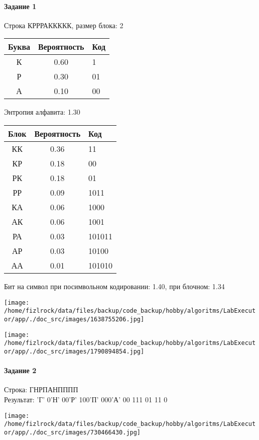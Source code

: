 \documentclass[a4paper, 12pt]{article}
\begin{document}
\paragraph{Задание 1}

Строка КРРРАККККК, размер блока: 2
\begin{center}
 \begin{tabular}{ |c|c|l| } 
  \hline
     Буква & Вероятность & Код\\ \hline
К & 0.60 & 1\\\hline
Р & 0.30 & 01\\\hline
А & 0.10 & 00
\\ \hline \end{tabular}
\end{center}
Энтропия алфавита: 1.30
\begin{center}
 \begin{tabular}{ |c|c|l| } 
  \hline
     Блок & Вероятность & Код\\ \hline
КК & 0.36 & 11\\\hline
КР & 0.18 & 00\\\hline
РК & 0.18 & 01\\\hline
РР & 0.09 & 1011\\\hline
КА & 0.06 & 1000\\\hline
АК & 0.06 & 1001\\\hline
РА & 0.03 & 101011\\\hline
АР & 0.03 & 10100\\\hline
АА & 0.01 & 101010
\\ \hline \end{tabular}
\end{center}
Бит на символ при посимвольном кодировании: 1.40, при блочном: 1.34

\texttt{[image: /home/fizlrock/data/files/backup/code\_backup/hobby/algoritms/LabExecutor/app/./doc\_src/images/1638755206.jpg]}

\texttt{[image: /home/fizlrock/data/files/backup/code\_backup/hobby/algoritms/LabExecutor/app/./doc\_src/images/1790894854.jpg]}
\pagebreak
\paragraph{Задание 2}

Строка: 
ГНРПАНПППП\\
Результат: 'Г' 0'Н' 00'Р' 100'П' 000'А' 00 111 01 11 0

\texttt{[image: /home/fizlrock/data/files/backup/code\_backup/hobby/algoritms/LabExecutor/app/./doc\_src/images/730466430.jpg]}
\end{document}

